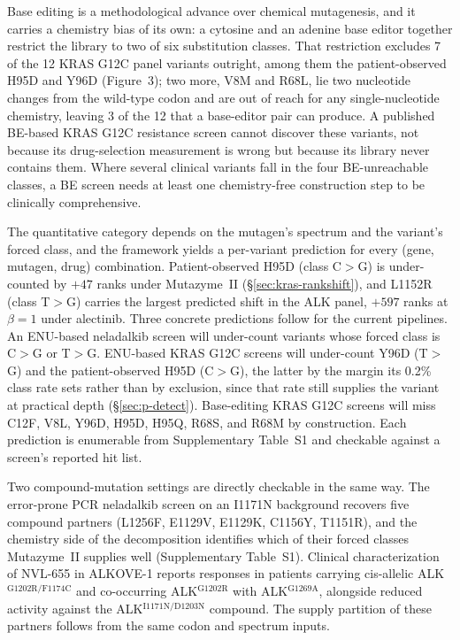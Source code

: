 \documentclass[11pt,a4paper]{article}
\begin{document}
Base editing is a methodological advance over chemical mutagenesis, and
it carries a chemistry bias of its own: a cytosine and an adenine base
editor together restrict the library to two of six substitution classes.
That restriction excludes 7 of the 12 KRAS G12C panel variants outright,
among them the patient-observed H95D and Y96D (Figure~3); two more,
V8M and R68L, lie two nucleotide changes from the wild-type codon and
are out of reach for any single-nucleotide chemistry, leaving 3 of the
12 that a base-editor pair can produce. A published
BE-based KRAS G12C resistance screen \citep{diaz2025} cannot discover
these variants, not because its drug-selection measurement is wrong but
because its library never contains them. Where several clinical variants
fall in the four BE-unreachable classes, a BE screen needs at least one
chemistry-free construction step to be clinically comprehensive.

The quantitative category depends on the mutagen's spectrum and the
variant's forced class, and the framework yields a per-variant
prediction for every (gene, mutagen, drug) combination. Patient-observed
H95D (class C$>$G) is under-counted by $+47$ ranks under Mutazyme~II
(\S\ref{sec:kras-rankshift}), and L1152R (class T$>$G) carries the
largest predicted shift in the ALK panel, $+597$ ranks at $\beta=1$
under alectinib. Three concrete predictions follow for the current
pipelines. An ENU-based neladalkib screen \citep{tangpeerachaikul2025}
will under-count variants whose forced class is C$>$G or T$>$G.
ENU-based KRAS G12C screens will under-count Y96D (T$>$G) and the
patient-observed H95D (C$>$G), the latter by the margin its 0.2\% class
rate sets rather than by exclusion, since that rate still supplies the
variant at practical depth (\S\ref{sec:p-detect}). Base-editing
KRAS G12C screens will miss C12F, V8L, Y96D, H95D, H95Q, R68S, and
R68M by construction. Each prediction is enumerable from Supplementary
Table~S1 and checkable against a screen's reported hit list.

Two compound-mutation settings are directly checkable in the same way.
The error-prone PCR neladalkib screen on an I1171N background
\citep{takei2025} recovers five compound partners (L1256F, E1129V,
E1129K, C1156Y, T1151R), and the chemistry side of the decomposition
identifies which of their forced classes Mutazyme~II supplies well
(Supplementary Table~S1). Clinical characterization of NVL-655 in
ALKOVE-1 \citep{lin2024} reports responses in patients carrying
cis-allelic ALK$^{\mathrm{G1202R/F1174C}}$ and co-occurring
ALK$^{\mathrm{G1202R}}$ with ALK$^{\mathrm{G1269A}}$, alongside reduced
activity against the ALK$^{\mathrm{I1171N/D1203N}}$ compound. The supply
partition of these partners follows from the same codon and spectrum
inputs.
\end{document}
